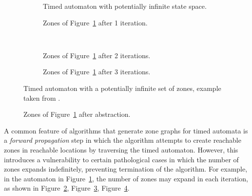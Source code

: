 \documentclass[a4paper]{llncs}
\begin{document}
\begin{figure}
  \centering
  \begin{subfigure}[b]{0.5\textwidth}
    \centering
    \def\svgwidth{\columnwidth}
    
    \caption{Timed automaton with potentially infinite state space.}
    \label{breaking2}
  \end{subfigure}%

  \begin{subfigure}[b]{0.3\textwidth}
    \centering
    \def\svgwidth{\columnwidth}
    
    \caption{Zones of Figure~\ref{breaking2} after 1 iteration.}
    \label{breaking2-zones01}
  \end{subfigure}
  ~ %
  \begin{subfigure}[b]{0.6\textwidth}
    \centering
    \def\svgwidth{\columnwidth}
    
    \caption{Zones of Figure~\ref{breaking2} after 2 iterations.}
    \label{breaking2-zones02}
  \end{subfigure}

  \begin{subfigure}[b]{\textwidth}
    \centering
    \def\svgwidth{0.9\columnwidth}
    
    \caption{Zones of Figure~\ref{breaking2} after 3 iterations.}
    \label{breaking2-zones03}
  \end{subfigure}
  \caption{Timed automaton with a potentially infinite
    set of zones, example taken from \cite{Behrmann03staticguard}.}
  \label{breaking2withzones}
\end{figure}

\begin{figure}
  \centering
  \def\svgwidth{0.9\columnwidth}
  
  \caption{Zones of Figure~\ref{breaking2} after abstraction.}
\end{figure}

A common feature of algorithms that generate zone graphs for timed
automata is a \emph{forward propagation} step in which the algorithm attempts to
create reachable zones in reachable locations by traversing the timed
automaton. However, this introduces a vulnerability to certain
pathological cases in which the number of zones expands indefinitely,
preventing termination of the algorithm. For example, in the automaton in
Figure~\ref{breaking2}, the number of zones may expand in each
iteration, as shown in Figure~\ref{breaking2-zones01},
Figure~\ref{breaking2-zones02}, Figure~\ref{breaking2-zones03}.
\end{document}
